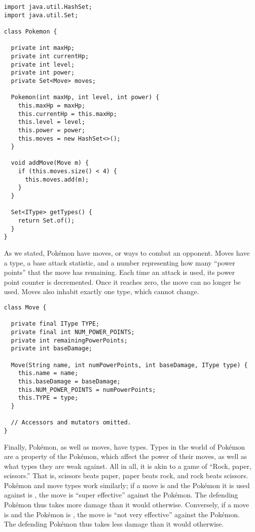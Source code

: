 \begin{lstlisting}[language=MyJava]
import java.util.HashSet;
import java.util.Set; 

class Pokemon {
  
  private int maxHp;
  private int currentHp;
  private int level;
  private int power;
  private Set<Move> moves;

  Pokemon(int maxHp, int level, int power) {
    this.maxHp = maxHp;
    this.currentHp = this.maxHp;
    this.level = level;
    this.power = power;
    this.moves = new HashSet<>();
  }

  void addMove(Move m) { 
    if (this.moves.size() < 4) {
      this.moves.add(m);
    }
  }

  Set<IType> getTypes() {
    return Set.of();
  }
}
\end{lstlisting}

As we stated, Pok\'emon have moves, or ways to combat an opponent. Moves have a type, a base attack statistic, and a number representing how many ``power points'' that the move has remaining. Each time an attack is used, its power point counter is decremented. Once it reaches zero, the move can no longer be used. Moves also inhabit exactly one type, which cannot change.

\begin{lstlisting}[language=MyJava]
class Move {

  private final IType TYPE;
  private final int NUM_POWER_POINTS;
  private int remainingPowerPoints;
  private int baseDamage;

  Move(String name, int numPowerPoints, int baseDamage, IType type) {
    this.name = name;
    this.baseDamage = baseDamage;
    this.NUM_POWER_POINTS = numPowerPoints;
    this.TYPE = type;
  }

  // Accessors and mutators omitted.
}
\end{lstlisting}

Finally, Pok\'emon, as well as moves, have types. Types in the world of Pok\'emon are a property of the Pok\'emon, which affect the power of their moves, as well as what types they are weak against. All in all, it is akin to a game of ``Rock, paper, scissors.'' That is, scissors beats paper, paper beats rock, and rock beats scissors. Pok\'emon and move types work similarly; if a move is  and the Pok\'emon it is used against is , the move is ``super effective'' against the Pok\'emon. The defending Pok\'emon thus takes more damage than it would otherwise. Conversely, if a move is  and the Pok\'emon is , the move is ``not very effective'' against the Pok\'emon. The defending Pok\'emon thus takes less damage than it would otherwise. 

